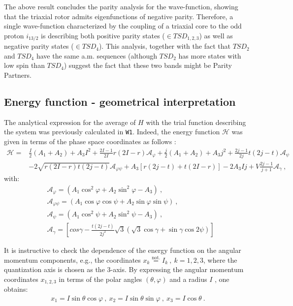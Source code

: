 \documentclass[11pt]{article}
\begin{document}
The above result concludes the parity analysis for the wave-function, showing that the triaxial rotor admits eigenfunctions  of negative parity. Therefore, a single wave-function characterized by the coupling of a triaxial core to the odd proton $i_{13/2}$ is describing both positive parity states ($\in TSD_{1,2,3}$) as well as negative parity states ($\in TSD_4$). This analysis, together with the fact that $TSD_2$ and $TSD_4$ have the same a.m. sequences (although $TSD_2$ has more states with low spin than $TSD_4$) suggest the fact that these two bands might be Parity Partners.

\subsection{Energy function - geometrical interpretation}

The analytical expression for the average of $H$ with the trial function describing the system was previously calculated in \texttt{W1}. Indeed, the energy function $\mathcal{H}$ was given in terms of the phase space coordinates as follows \cite{raduta2020approach}:
\begin{align}
    \mathcal{H}=&\frac{I}{2}(A_1+A_2)+A_3I^2+\frac{2I-1}{2I}r(2I-r)\mathcal{A}_\varphi+\frac{j}{2}(A_1+A_2)+A_3j^2+\frac{2j-1}{2j}t(2j-t)\mathcal{A}_\psi \nonumber\\
    &-2\sqrt{r(2I-r)t(2j-t)}\mathcal{A}_{\varphi\psi}+A_3\left[r(2j-t)+t(2I-r)\right]-2A_3Ij+V\frac{2j-1}{j+1}\mathcal{A}_\gamma\ ,
    \label{energy-function-analytical}
\end{align}
with:
\begin{align}
    &\mathcal{A}_\varphi=(A_1\cos^2\varphi+A_2\sin^2\varphi-A_3)\ , \nonumber\\
    &\mathcal{A}_{\varphi\psi}=(A_1\cos\varphi\cos\psi+A_2\sin\varphi\sin\psi)\ ,\nonumber\\
    &\mathcal{A}_\psi=(A_1\cos^2\psi+A_2\sin^2\psi-A_3)\ , \nonumber\\
    &\mathcal{A}_\gamma=\left[cos\gamma-\frac{t(2j-t)}{2j^2}\sqrt{3}(\sqrt{3}\cos\gamma+\sin\gamma\cos2\psi)\right]
\end{align}

It is instructive to check the dependence of the energy function on the angular momentum components, e.g., the coordinates $x_k\overset{\mathrm{not.}}{=}I_k\ ,\ k=1,2,3$, where the quantization axis is chosen as the 3-axis. By expressing the angular momentum coordinates $x_{1,2,3}$ in terms of the polar angles $(\theta,\varphi)$ and a radius $I$ , one obtains: 
\begin{align}
    x_1=I\sin\theta\cos\varphi\ ,\ x_2=I\sin\theta\sin\varphi\ ,\ x_3=I\cos\theta\ .
    \label{coordinate-parametrization}
\end{align}
\end{document}
